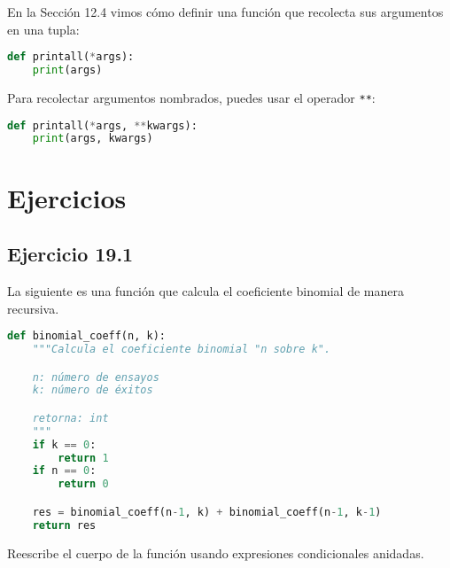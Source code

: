En la Sección 12.4 vimos cómo definir una función que recolecta sus argumentos en una tupla:

\begin{lstlisting}[language=Python]
def printall(*args):
    print(args)
\end{lstlisting}

Para recolectar argumentos nombrados, puedes usar el operador \texttt{**}:

\begin{lstlisting}[language=Python]
def printall(*args, **kwargs):
    print(args, kwargs)
\end{lstlisting}

\section{Ejercicios}

\subsection*{Ejercicio 19.1}

La siguiente es una función que calcula el coeficiente binomial de manera recursiva.

\begin{lstlisting}[language=Python]
def binomial_coeff(n, k):
    """Calcula el coeficiente binomial "n sobre k".

    n: número de ensayos
    k: número de éxitos

    retorna: int
    """
    if k == 0:
        return 1
    if n == 0:
        return 0

    res = binomial_coeff(n-1, k) + binomial_coeff(n-1, k-1)
    return res
\end{lstlisting}

Reescribe el cuerpo de la función usando expresiones condicionales anidadas.
